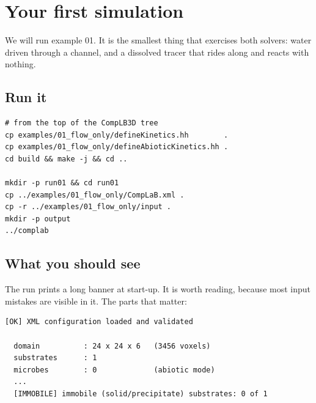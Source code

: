 
\chapter{Your first simulation}
\label{ch:first}

We will run example 01. It is the smallest thing that exercises both solvers:
water driven through a channel, and a dissolved tracer that rides along and
reacts with nothing.

\section{Run it}

\begin{lstlisting}[style=sh]
# from the top of the CompLB3D tree
cp examples/01_flow_only/defineKinetics.hh        .
cp examples/01_flow_only/defineAbioticKinetics.hh .
cd build && make -j && cd ..

mkdir -p run01 && cd run01
cp ../examples/01_flow_only/CompLaB.xml .
cp -r ../examples/01_flow_only/input .
mkdir -p output
../complab
\end{lstlisting}



\section{What you should see}

The run prints a long banner at start-up. It is worth reading, because most
input mistakes are visible in it. The parts that matter:

\begin{lstlisting}[style=sh]
[OK] XML configuration loaded and validated

  domain          : 24 x 24 x 6   (3456 voxels)
  substrates      : 1
  microbes        : 0             (abiotic mode)
  ...
  [IMMOBILE] immobile (solid/precipitate) substrates: 0 of 1
\end{lstlisting}

